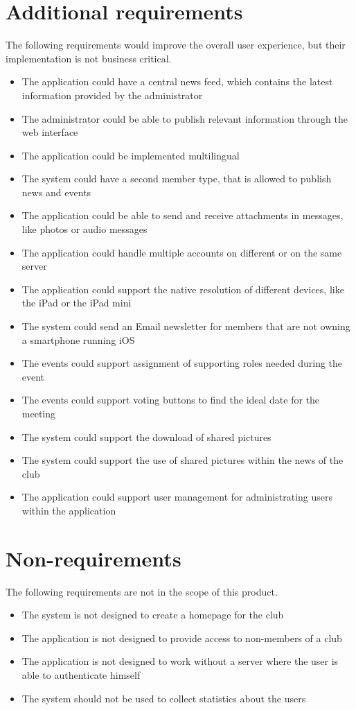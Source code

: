 \section{Additional requirements}
The following requirements would improve the overall user experience, but their implementation is not business critical.
\begin{itemize}
\item The application could have a central news feed, which contains the latest information provided by the administrator
\item The administrator could be able to publish relevant information through the web interface
\item The application could be implemented multilingual
\item The system could have a second member type, that is allowed to publish news and events
\item The application could be able to send and receive attachments in messages, like photos or audio messages
\item The application could handle multiple accounts on different or on the same server
\item The application could support the native resolution of different devices, like the iPad or the iPad mini
\item The system could send an Email newsletter for members that are not owning a smartphone running iOS
\item The events could support assignment of supporting roles needed during the event
\item The events could support voting buttons to find the ideal date for the meeting
\item The system could support the download of shared pictures
\item The system could support the use of shared pictures within the news of the club
\item The application could support user management for administrating users within the application
\end{itemize}

\section{Non-requirements} %
The following requirements are not in the scope of this product.
\begin{itemize}
\item The system is not designed to create a homepage for the club
\item The application is not designed to provide access to non-members of a club
\item The application is not designed to work without a server where the user is able to authenticate himself
\item The system should not be used to collect statistics about the users
\end{itemize}

